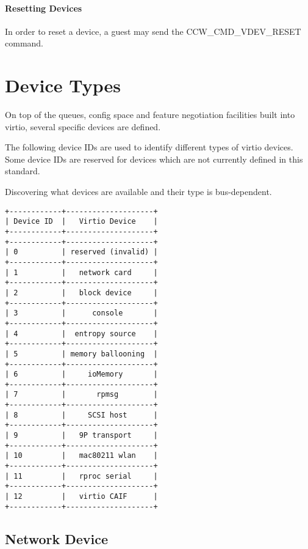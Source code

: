 \subsubsection{Resetting Devices}\label{sec:Virtio Transport Options / Virtio over channel I/O / Device Operation / Resetting Devices}

In order to reset a device, a guest may send the
CCW_CMD_VDEV_RESET command.


\chapter{Device Types}\label{sec:Device Types}

On top of the queues, config space and feature negotiation facilities
built into virtio, several specific devices are defined.

The following device IDs are used to identify different types of virtio
devices.  Some device IDs are reserved for devices which are not currently
defined in this standard.

Discovering what devices are available and their type is bus-dependent.

\begin{verbatim}
+------------+--------------------+
| Device ID  |   Virtio Device    |
+------------+--------------------+
+------------+--------------------+
| 0          | reserved (invalid) |
+------------+--------------------+
| 1          |   network card     |
+------------+--------------------+
| 2          |   block device     |
+------------+--------------------+
| 3          |      console       |
+------------+--------------------+
| 4          |  entropy source    |
+------------+--------------------+
| 5          | memory ballooning  |
+------------+--------------------+
| 6          |     ioMemory       |
+------------+--------------------+
| 7          |       rpmsg        |
+------------+--------------------+
| 8          |     SCSI host      |
+------------+--------------------+
| 9          |   9P transport     |
+------------+--------------------+
| 10         |   mac80211 wlan    |
+------------+--------------------+
| 11         |   rproc serial     |
+------------+--------------------+
| 12         |   virtio CAIF      |
+------------+--------------------+
\end{verbatim}

\section{Network Device}\label{sec:Device Types / Network Device}

